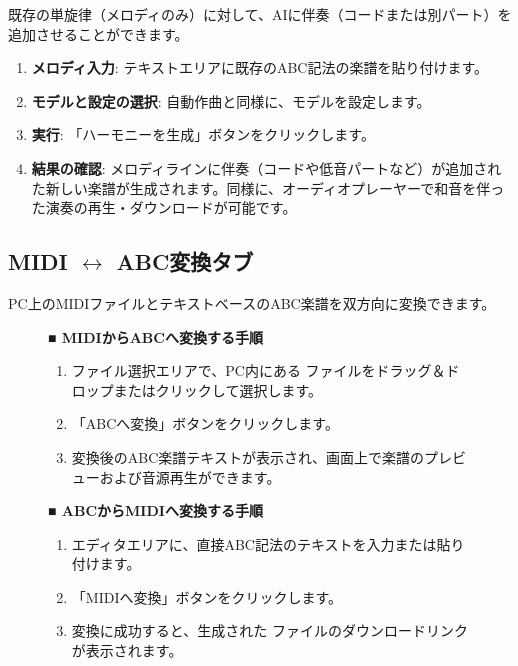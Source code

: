 既存の単旋律（メロディのみ）に対して、AIに伴奏（コードまたは別パート）を追加させることができます。

\begin{enumerate}
  \item \textbf{メロディ入力}: テキストエリアに既存のABC記法の楽譜を貼り付けます。
  \item \textbf{モデルと設定の選択}: 自動作曲と同様に、モデルを設定します。
  \item \textbf{実行}: 「ハーモニーを生成」ボタンをクリックします。
  \item \textbf{結果の確認}: メロディラインに伴奏（コードや低音パートなど）が追加された新しい楽譜が生成されます。同様に、オーディオプレーヤーで和音を伴った演奏の再生・ダウンロードが可能です。
\end{enumerate}

\subsection{\texorpdfstring{MIDI $\leftrightarrow$ ABC変換タブ}{MIDI-ABC変換タブ}}

PC上のMIDIファイルとテキストベースのABC楽譜を双方向に変換できます。

\begin{figure}[htbp]
  \centering
  \begin{tcolorbox}[mybox, title={MIDI $\leftrightarrow$ ABC 双方向変換の操作}]
    \textbf{■ MIDIからABCへ変換する手順}
    \begin{enumerate}
      \item ファイル選択エリアで、PC内にある  ファイルをドラッグ＆ドロップまたはクリックして選択します。
      \item 「ABCへ変換」ボタンをクリックします。
      \item 変換後のABC楽譜テキストが表示され、画面上で楽譜のプレビューおよび音源再生ができます。
    \end{enumerate}
    \vspace{0.2cm}
    \textbf{■ ABCからMIDIへ変換する手順}
    \begin{enumerate}
      \item エディタエリアに、直接ABC記法のテキストを入力または貼り付けます。
      \item 「MIDIへ変換」ボタンをクリックします。
      \item 変換に成功すると、生成された  ファイルのダウンロードリンクが表示されます。
    \end{enumerate}
  \end{tcolorbox}
\end{figure}

